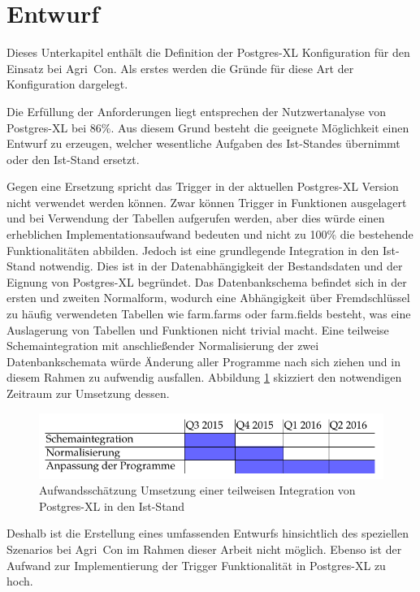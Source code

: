 \section{Entwurf}
Dieses Unterkapitel enthält die Definition der Postgres-XL Konfiguration für den Einsatz bei Agri~Con.
Als erstes werden die Gründe für diese Art der Konfiguration dargelegt.

Die Erfüllung der Anforderungen liegt entsprechen der Nutzwertanalyse von Postgres-XL bei 86\%{}.
Aus diesem Grund besteht die geeignete Möglichkeit einen Entwurf zu erzeugen, welcher wesentliche Aufgaben des Ist-Standes übernimmt oder den Ist-Stand ersetzt.

Gegen eine Ersetzung spricht das Trigger in der aktuellen Postgres-XL Version nicht verwendet werden können.
Zwar können Trigger in Funktionen ausgelagert und bei Verwendung der Tabellen aufgerufen werden, aber dies würde einen erheblichen Implementationsaufwand bedeuten und nicht zu 100\%{} die bestehende Funktionalitäten abbilden.
Jedoch ist eine grundlegende Integration in den Ist-Stand notwendig. %
Dies ist in der Datenabhängigkeit der Bestandsdaten und der Eignung von Postgres-XL begründet.
Das Datenbankschema befindet sich in der ersten und zweiten Normalform, wodurch eine Abhängigkeit über Fremdschlüssel zu häufig verwendeten Tabellen wie farm.farms oder farm.fields besteht, was eine Auslagerung von Tabellen und Funktionen nicht trivial macht.
Eine teilweise Schemaintegration mit anschließender Normalisierung der zwei Datenbankschemata würde Änderung aller Programme nach sich ziehen und in diesem Rahmen zu aufwendig ausfallen.
Abbildung \ref{fig:aufwand} skizziert den notwendigen Zeitraum zur Umsetzung dessen.
\begin{figure}[h!]
\centering
\includegraphics[width=.8\textwidth]{Abbildungen/gantt_aufwand_umsetzung_cropped.pdf}
\caption[Aufwandsschätzung Umsetzung einer teilweisen Integration von Postgres-XL]{Aufwandsschätzung Umsetzung einer teilweisen Integration von Postgres-XL in den Ist-Stand}
\label{fig:aufwand}
\end{figure}
Deshalb ist die Erstellung eines umfassenden Entwurfs hinsichtlich des speziellen Szenarios bei Agri~Con im Rahmen dieser Arbeit nicht möglich.
Ebenso ist der Aufwand zur Implementierung der Trigger Funktionalität in Postgres-XL zu hoch.

